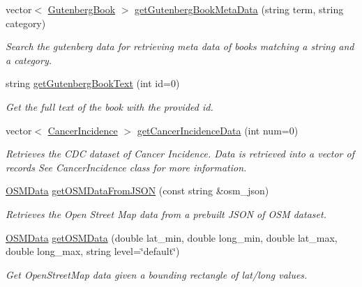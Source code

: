 \begin{DoxyCompactItemize}
vector$<$ \hyperlink{classbridges_1_1dataset_1_1_gutenberg_book}{Gutenberg\+Book} $>$ \hyperlink{classbridges_1_1_data_source_a2fe055cad56b45186df7e1974f688a6b}{get\+Gutenberg\+Book\+Meta\+Data} (string term, string category)
\begin{DoxyCompactList}\small\item\em Search the gutenberg data for retrieving meta data of books matching a string and a category. \end{DoxyCompactList}\item 
string \hyperlink{classbridges_1_1_data_source_a4debe81d7980b2cb5c22f8fc0bd02f60}{get\+Gutenberg\+Book\+Text} (int id=0)
\begin{DoxyCompactList}\small\item\em Get the full text of the book with the provided id. \end{DoxyCompactList}\item 
vector$<$ \hyperlink{classbridges_1_1dataset_1_1_cancer_incidence}{Cancer\+Incidence} $>$ \hyperlink{classbridges_1_1_data_source_a52d8161e7c093ab3615acea7085f6689}{get\+Cancer\+Incidence\+Data} (int num=0)
\begin{DoxyCompactList}\small\item\em Retrieves the C\+DC dataset of Cancer Incidence. Data is retrieved into a vector of records See Cancer\+Incidence class for more information. \end{DoxyCompactList}\item 
\hyperlink{classbridges_1_1dataset_1_1_o_s_m_data}{O\+S\+M\+Data} \hyperlink{classbridges_1_1_data_source_a1b483de1cce9921b70116213382cdaf0}{get\+O\+S\+M\+Data\+From\+J\+S\+ON} (const string \&osm\+\_\+json)
\begin{DoxyCompactList}\small\item\em Retrieves the Open Street Map data from a prebuilt J\+S\+ON of O\+SM dataset. \end{DoxyCompactList}\item 
\hyperlink{classbridges_1_1dataset_1_1_o_s_m_data}{O\+S\+M\+Data} \hyperlink{classbridges_1_1_data_source_a57736934a90bdb86948a7c338ec81a2d}{get\+O\+S\+M\+Data} (double lat\+\_\+min, double long\+\_\+min, double lat\+\_\+max, double long\+\_\+max, string level=\char`\"{}default\char`\"{})
\begin{DoxyCompactList}\small\item\em Get Open\+Street\+Map data given a bounding rectangle of lat/long values. \end{DoxyCompactList}\item 

\end{DoxyCompactItemize}

